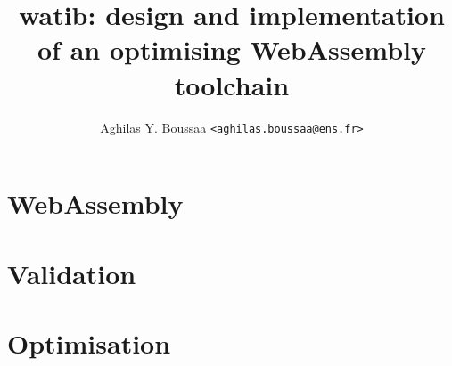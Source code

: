 \documentclass[11pt]{article}
\author{Aghilas Y. Boussaa \texttt{<aghilas.boussaa@ens.fr>}}
\title{\textsf{watib}: design and implementation of an optimising WebAssembly toolchain}
\begin{document}
\maketitle
\begin{abstract}
\end{abstract}
\section{WebAssembly}
\section{Validation}
\section{Optimisation}
\end{document}
